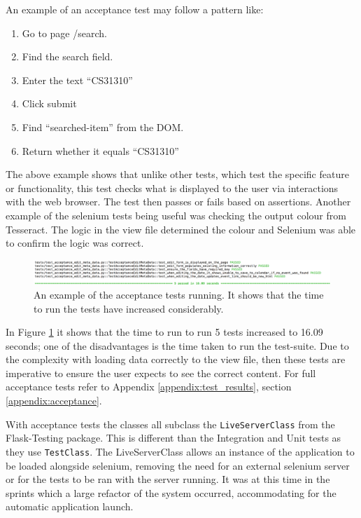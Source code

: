 An example of an acceptance test may follow a pattern like:
\begin{enumerate}
  \item Go to page /search.
  \item Find the search field.
  \item Enter the text ``CS31310''
  \item Click submit
  \item Find ``searched-item'' from the DOM.
  \item Return whether it equals ``CS31310''
\end{enumerate}

The above example shows that unlike other tests, which test the specific feature or functionality, this test checks what is displayed to the user via interactions with the web browser. The test then passes or fails based on assertions. Another example of the selenium tests being useful was checking the output colour from Tesseract. The logic in the view file determined the colour and Selenium was able to confirm the logic was correct.

\begin{figure}[h!]
  \centering
  \includegraphics[width=\textwidth]{images/acceptance_test_1}
  \caption{An example of the acceptance tests running. It shows that the time to run the tests have increased considerably.}
  \label{fig:acceptance_test_1}
\end{figure}

In Figure \ref{fig:acceptance_test_1} it shows that the time to run to run 5 tests increased to 16.09 seconds; one of the disadvantages is the time taken to run the test-suite. Due to the complexity with loading data correctly to the view file, then these tests are imperative to ensure the user expects to see the correct content. For full acceptance tests refer to Appendix \ref{appendix:test_results}, section \ref{appendix:acceptance}.

With acceptance tests the classes all subclass the \lstinline[basicstyle=\normalsize\ttfamily]{LiveServerClass} from the Flask-Testing package. This is different than the Integration and Unit tests as they use \lstinline[basicstyle=\normalsize\ttfamily]{TestClass}. The LiveServerClass allows an instance of the application to be loaded alongside selenium, removing the need for an external selenium server or for the tests to be ran with the server running. It was at this time in the sprints which a large refactor of the system occurred, accommodating for the automatic application launch. 


